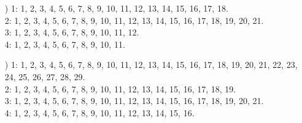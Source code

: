 \documentclass[a4paper,11pt]{article}
\numberwithin{equation}{section}
\begin{document}
\begin{itemize}
\item[\romannumeral8)] 1: 1, 2, 3, 4, 5, 6, 7, 8, 9, 10, 11, 12, 13, 14, 15,
  16, 17, 18. \\
  2: 1, 2, 3, 4, 5, 6, 7, 8, 9, 10, 11, 12, 13, 14, 15, 16, 17, 18, 19, 20,
  21. \\
  3: 1, 2, 3, 4, 5, 6, 7, 8, 9, 10, 11, 12. \\
  4: 1, 2, 3, 4, 5, 6, 7, 8, 9, 10, 11.

\item[\romannumeral9)] 1: 1, 2, 3, 4, 5, 6, 7, 8, 9, 10, 11, 12, 13, 14, 15,
  16, 17, 18, 19, 20, 21, 22, 23, 24, 25, 26, 27, 28, 29. \\
  2: 1, 2, 3, 4, 5, 6, 7, 8, 9, 10, 11, 12, 13, 14, 15, 16, 17, 18, 19. \\
  3: 1, 2, 3, 4, 5, 6, 7, 8, 9, 10, 11, 12, 13, 14, 15, 16, 17, 18, 19, 20,
  21. \\
  4: 1, 2, 3, 4, 5, 6, 7, 8, 9, 10, 11, 12, 13, 14, 15, 16.

\end{itemize}













{}






\end{document}
